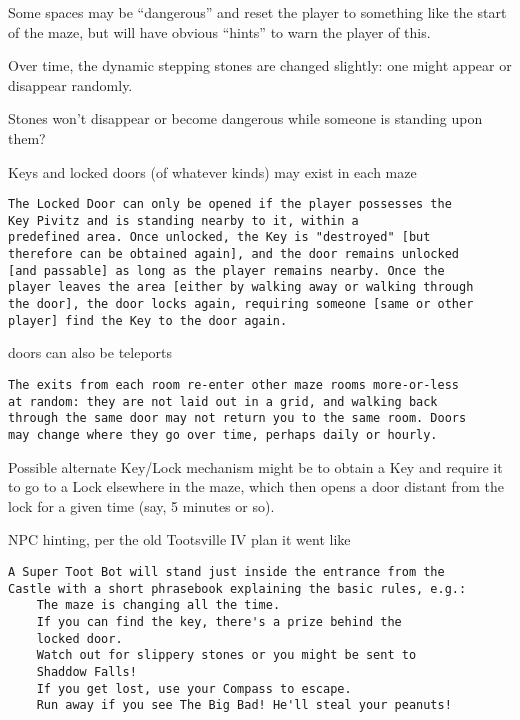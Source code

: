 \documentclass[11pt]{article}
\begin{document}
Some spaces may be “dangerous” and reset the player to something like
the start of the maze, but will have obvious “hints” to warn the
player of this.

Over time, the dynamic stepping stones are changed slightly: one
might appear or disappear randomly.

Stones won't disappear or become dangerous while someone is
standing upon them?

Keys and locked doors (of whatever kinds) may exist in each maze

\begin{verbatim}
The Locked Door can only be opened if the player possesses the
Key Pivitz and is standing nearby to it, within a
predefined area. Once unlocked, the Key is "destroyed" [but
therefore can be obtained again], and the door remains unlocked
[and passable] as long as the player remains nearby. Once the
player leaves the area [either by walking away or walking through
the door], the door locks again, requiring someone [same or other
player] find the Key to the door again.
\end{verbatim}

doors can also be teleports

\begin{verbatim}
The exits from each room re-enter other maze rooms more-or-less
at random: they are not laid out in a grid, and walking back
through the same door may not return you to the same room. Doors
may change where they go over time, perhaps daily or hourly.
\end{verbatim}

Possible alternate Key/Lock mechanism might be to obtain a Key and
require it to go to a Lock elsewhere in the maze, which then opens a
door distant from the lock for a given time (say, 5 minutes or
so).

NPC hinting, per the old Tootsville IV plan it went like

\begin{verbatim}
A Super Toot Bot will stand just inside the entrance from the
Castle with a short phrasebook explaining the basic rules, e.g.:
    The maze is changing all the time.
    If you can find the key, there's a prize behind the
    locked door.
    Watch out for slippery stones or you might be sent to
    Shaddow Falls!
    If you get lost, use your Compass to escape.
    Run away if you see The Big Bad! He'll steal your peanuts!

\end{verbatim}
\end{document}
